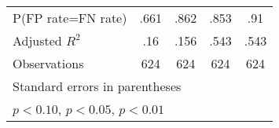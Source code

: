 \begin{tabular}{l*{4}{c}}
\hline
P(FP rate=FN rate)&     .661         &     .862         &     .853         &      .91         \\
Adjusted \(R^{2}\)&      .16         &     .156         &     .543         &     .543         \\
Observations    &      624         &      624         &      624         &      624         \\
\hline\hline
\multicolumn{5}{l}{\footnotesize Standard errors in parentheses}\\
\multicolumn{5}{l}{\footnotesize \sym{*} \(p<0.10\), \sym{**} \(p<0.05\), \sym{***} \(p<0.01\)}\\
\end{tabular}

